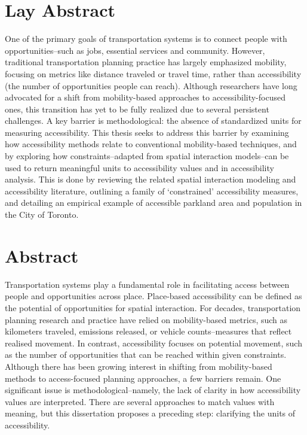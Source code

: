 \documentclass[
11pt, %
oneside, %
english, %
singlespacing, %
]{macthesis} %
\def\blankpage{%
      \clearpage%
      \thispagestyle{empty}%
      \addtocounter{page}{-1}%
      \null%
      \clearpage}
\begin{document}
\section*{Lay Abstract}
  One of the primary goals of transportation systems is to connect people with opportunities--such as jobs, essential services and community. However, traditional transportation planning practice has largely emphasized mobility, focusing on metrics like distance traveled or travel time, rather than accessibility (the number of opportunities people can reach). Although researchers have long advocated for a shift from mobility-based approaches to accessibility-focused ones, this transition has yet to be fully realized due to several persistent challenges. A key barrier is methodological: the absence of standardized units for measuring accessibility. This thesis seeks to address this barrier by examining how accessibility methods relate to conventional mobility-based techniques, and by exploring how constraints--adapted from spatial interaction models--can be used to return meaningful units to accessibility values and in accessibility analysis. This is done by reviewing the related spatial interaction modeling and accessibility literature, outlining a family of `constrained' accessibility measures, and detailing an empirical example of accessible parkland area and population in the City of Toronto.
\blankpage
\clearpage



\section*{\Huge Abstract}
\addchaptertocentry{\abstractname}
Transportation systems play a fundamental role in facilitating access between people and opportunities across place. Place-based accessibility can be defined as the potential of opportunities for spatial interaction. For decades, transportation planning research and practice have relied on mobility-based metrics, such as kilometers traveled, emissions released, or vehicle counts--measures that reflect realised movement. In contrast, accessibility focuses on potential movement, such as the number of opportunities that can be reached within given constraints. Although there has been growing interest in shifting from mobility-based methods to access-focused planning approaches, a few barriers remain. One significant issue is methodological--namely, the lack of clarity in how accessibility values are interpreted. There are several approaches to match values with meaning, but this dissertation proposes a preceding step: clarifying the units of accessibility.
\end{document}

